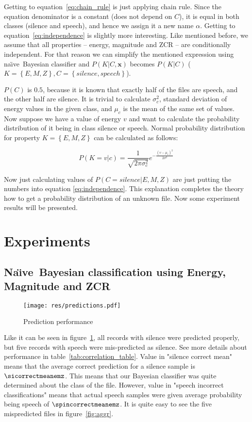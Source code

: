 \documentclass[english,11pt]{article}
\numberwithin{equation}{section}
\newcommand{\naive}{na\"{\i}ve\ }
\newcommand{\Naive}{Na\"{\i}ve\ }
\begin{document}
Getting to equation~\ref{eq:chain_rule} is just applying chain rule. Since the
equation denominator is a constant (does not depend on $C$), it is equal in
both classes (silence and speech), and hence we assign it a new name $\alpha$.
Getting to equation~\ref{eq:independence} is slightly more interesting. Like
mentioned before, we assume that all properties -- energy, magnitude and ZCR --
are conditionally independent. For that reason we can simplify the mentioned
expression using \naive Bayesian classifier and $P(K | C, \mathbf{x})$ becomes
$P(K|C)$ ($K = \left\{E, M, Z\right\}, C = \left\{ silence, speech \right\}$).

$P(C)$ is $0.5$, because it is known that exactly half of the files are speech,
and the other half are silence. It is trivial to calculate $\sigma_{c}^{2}$,
standard deviation of energy values in the given class, and $\mu_{c}$ is the
mean of the same set of values. Now suppose we have a value of energy $v$ and
want to calculate the probability distribution of it being in class silence or
speech. Normal probability distribution for property $K = \left\{E, M,
Z\right\}$ can be calculated as follows:

$$
P(K = v|c) = \frac{1}{\sqrt{2 \pi \sigma_{c}^{2}}}
e ^{- \frac{ (v - \mu_{c})^2 }{2 \sigma^2} }
$$

Now just calculating values of $P(C=silence| E, M, Z)$ are just putting the
numbers into equation \ref{eq:independence}. This explanation completes the
theory how to get a probability distribution of an unknown file. Now some
experiment results will be presented.

\section{Experiments}

\subsection{\Naive Bayesian classification using Energy, Magnitude and ZCR}

\begin{figure}
    \centering
    \texttt{[image: res/predictions.pdf]}
    \caption{Prediction performance}
    \label{fig:simple_performance}
\end{figure}

Like it can be seen in figure~\ref{fig:simple_performance}, all records with
silence were predicted properly, but five records with speech were
mis-predicted as silence. See more details about performance in
table~\ref{tab:correlation_table}. Value in "silence correct mean" means that
the average correct prediction for a silence sample is $\sicorrectmeanemz$. This
means that our Bayesian classifier was quite determined about the class of the
file. However, value in "speech incorrect classifications" means that actual
speech samples were given average probability being speech of
$\spincorrectmeanemz$. It is quite easy to see the five mispredicted files in
figure~\ref{fig:aggr}.
\end{document}
